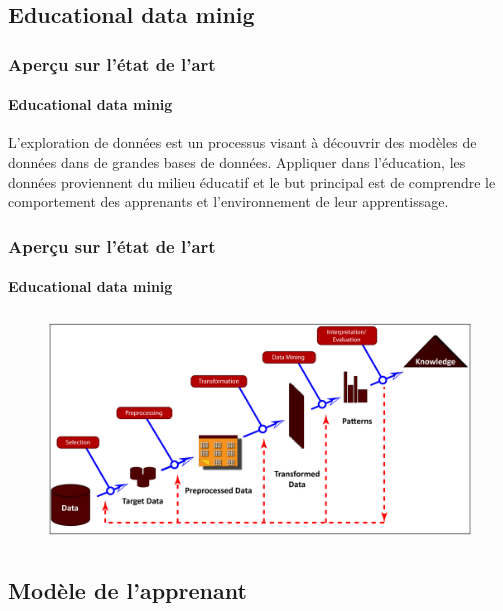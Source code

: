 \documentclass[aspectratio=169,professionalfonts, 12pt]{beamer}
\begin{document}
\subsection{Educational data minig}

\begin{frame}
  \frametitle{Aperçu sur l'état de l'art}
  \framesubtitle{Educational data minig}
  \justifying 
  \begin{minipage}{\textwidth}
  \begin{block}{}
    L’exploration de données est un processus visant à découvrir des modèles de données dans de grandes bases de données. Appliquer dans l’éducation, les données proviennent du milieu éducatif et le but principal est de comprendre le comportement des apprenants et l’environnement de leur apprentissage.  
  \end{block}
  \end{minipage}
\end{frame}

\begin{frame}
  \frametitle{Aperçu sur l'état de l'art}
  \framesubtitle{Educational data minig}
  \justifying 
  \begin{minipage}{\textwidth}
  \begin{figure}[H]
      \includegraphics[height=6cm]{images/etat_art/extract_data_steps.png}
  \end{figure}
  \end{minipage}
\end{frame}


\subsection{Modèle de l’apprenant}
\end{document}
